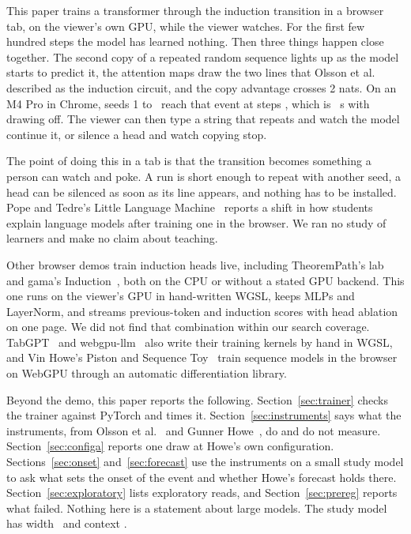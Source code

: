 \documentclass[10pt]{article}
\begin{document}
This paper trains a transformer through the induction transition in a browser tab, on the viewer's own GPU, while the viewer watches. For the first few hundred steps the model has learned nothing. Then three things happen close together. The second copy of a repeated random sequence lights up as the model starts to predict it, the attention maps draw the two lines that Olsson et al.~\cite{olsson} described as the induction circuit, and the copy advantage crosses 2 nats. On an M4 Pro in Chrome, seeds 1 to \nBenchSeeds\ reach that event at steps \nBenchEvents, which is \nBenchSeconds\ s with drawing off. The viewer can then type a string that repeats and watch the model continue it, or silence a head and watch copying stop.

The point of doing this in a tab is that the transition becomes something a person can watch and poke. A run is short enough to repeat with another seed, a head can be silenced as soon as its line appears, and nothing has to be installed. Pope and Tedre's Little Language Machine~\cite{llm} reports a shift in how students explain language models after training one in the browser. We ran no study of learners and make no claim about teaching.

Other browser demos train induction heads live, including TheoremPath's lab~\cite{theorempath} and gama's Induction~\cite{gama}, both on the CPU or without a stated GPU backend. This one runs on the viewer's GPU in hand-written WGSL, keeps MLPs and LayerNorm, and streams previous-token and induction scores with head ablation on one page. We did not find that combination within our search coverage. TabGPT~\cite{tabgpt} and webgpu-llm~\cite{webgpullm} also write their training kernels by hand in WGSL, and Vin Howe's Piston and Sequence Toy~\cite{piston} train sequence models in the browser on WebGPU through an automatic differentiation library.

Beyond the demo, this paper reports the following. Section~\ref{sec:trainer} checks the trainer against PyTorch and times it. Section~\ref{sec:instruments} says what the instruments, from Olsson et al.~\cite{olsson} and Gunner Howe~\cite{howe}, do and do not measure. Section~\ref{sec:configa} reports one draw at Howe's own configuration. Sections~\ref{sec:onset} and~\ref{sec:forecast} use the instruments on a small study model to ask what sets the onset of the event and whether Howe's forecast holds there. Section~\ref{sec:exploratory} lists exploratory reads, and Section~\ref{sec:prereg} reports what failed. Nothing here is a statement about large models. The study model has width \nStudyD\ and context \nStudyT.
\end{document}
